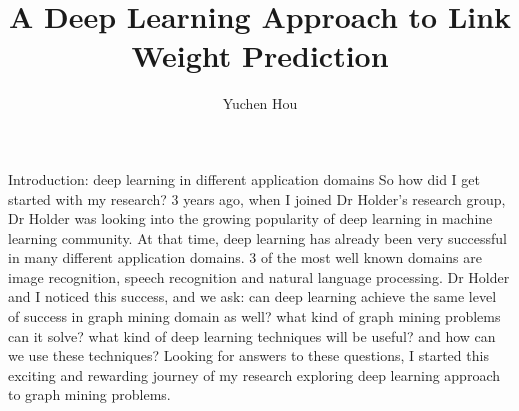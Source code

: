 \documentclass{beamer}
\title{A Deep Learning Approach to Link Weight Prediction}
\author{Yuchen Hou}
\date{}
\begin{document}

\begin{frame}{Introduction: deep learning in different application domains}
So how did I get started with my research? 3 years ago, when I joined Dr Holder's research group, Dr Holder was looking into the growing popularity of deep learning in machine learning community. At that time, deep learning has already been very successful in many different application domains. 3 of the most well known domains are image recognition, speech recognition and natural language processing. Dr Holder and I noticed this success, and we ask: can deep learning achieve the same level of success in graph mining domain as well? what kind of graph mining problems can it solve? what kind of deep learning techniques will be useful? and how can we use these techniques? Looking for answers to these questions, I started this exciting and rewarding journey of my research exploring deep learning approach to graph mining problems.
\end{frame}
\end{document}
